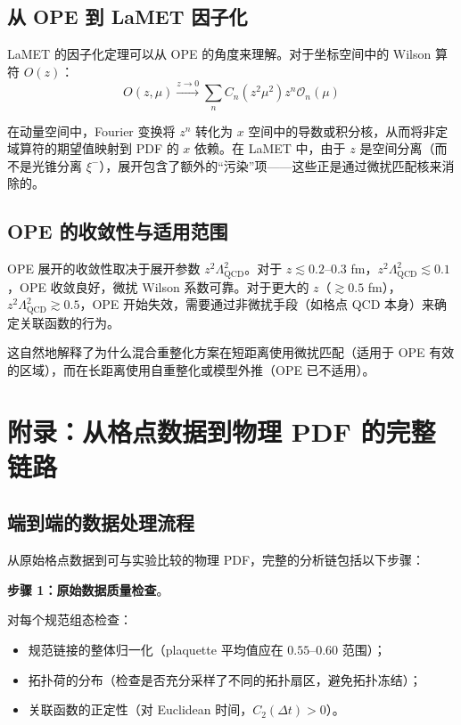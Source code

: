 \documentclass[11pt,a4paper]{ctexart}
\begin{document}
\subsection{从 OPE 到 LaMET 因子化}

LaMET 的因子化定理可以从 OPE 的角度来理解。对于坐标空间中的 Wilson 算符 $O(z)$：
\begin{equation}
O(z, \mu) \xrightarrow{z \to 0} \sum_n C_n(z^2 \mu^2) z^n \mathcal{O}_n(\mu)
\end{equation}

在动量空间中，Fourier 变换将 $z^n$ 转化为 $x$ 空间中的导数或积分核，从而将非定域算符的期望值映射到 PDF 的 $x$ 依赖。在 LaMET 中，由于 $z$ 是空间分离（而不是光锥分离 $\xi^-$），展开包含了额外的``污染''项——这些正是通过微扰匹配核来消除的。

\subsection{OPE 的收敛性与适用范围}

OPE 展开的收敛性取决于展开参数 $z^2 \Lambda_{\text{QCD}}^2$。对于 $z \lesssim 0.2\text{--}0.3$ fm，$z^2 \Lambda_{\text{QCD}}^2 \lesssim 0.1$，OPE 收敛良好，微扰 Wilson 系数可靠。对于更大的 $z$（$\gtrsim 0.5$ fm），$z^2 \Lambda_{\text{QCD}}^2 \gtrsim 0.5$，OPE 开始失效，需要通过非微扰手段（如格点 QCD 本身）来确定关联函数的行为。

这自然地解释了为什么混合重整化方案在短距离使用微扰匹配（适用于 OPE 有效的区域），而在长距离使用自重整化或模型外推（OPE 已不适用）。

\section{附录：从格点数据到物理 PDF 的完整链路}

\subsection{端到端的数据处理流程}

从原始格点数据到可与实验比较的物理 PDF，完整的分析链包括以下步骤：

\textbf{步骤 1：原始数据质量检查}。

对每个规范组态检查：
\begin{itemize}
  \item 规范链接的整体归一化（plaquette 平均值应在 $0.55\text{--}0.60$ 范围）；
  \item 拓扑荷的分布（检查是否充分采样了不同的拓扑扇区，避免拓扑冻结）；
  \item 关联函数的正定性（对 Euclidean 时间，$C_2(\Delta t) > 0$）。
\end{itemize}
\end{document}
